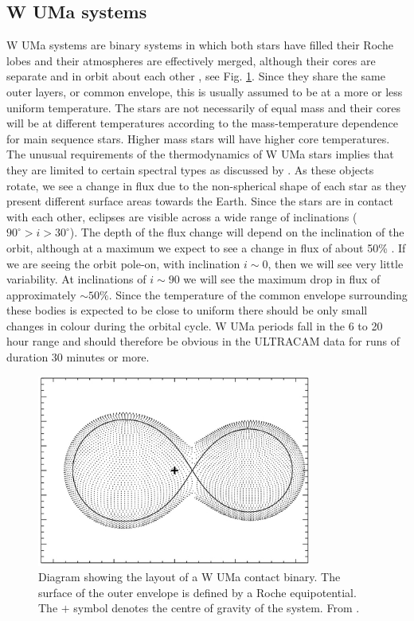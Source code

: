 \subsection{{W UMa} systems}
{W UMa} systems are binary systems in which both stars have filled their Roche lobes and their atmospheres are effectively merged, although their cores are separate and in orbit about each other \citep{Lucy68}, see Fig. \ref{fig:wumadiagram}. Since they share the same outer layers, or common envelope, this is usually assumed to be at a more or less uniform temperature. The stars are not necessarily of equal mass and their cores will be at different temperatures according to the mass-temperature dependence for main sequence stars. Higher mass stars will have higher core temperatures. The unusual requirements of the thermodynamics of W UMa stars implies that they are limited to certain spectral types as discussed by \citet{Lucy68}.  As these objects rotate, we see a change in flux due to the non-spherical shape of each star as they present different surface areas towards the Earth. Since the stars are in contact with each other, eclipses are visible across a wide range of inclinations ($90^\circ > i > 30^\circ$). The depth of the flux change will depend on the inclination of the orbit, although at a maximum we expect to see a change in flux of about 50\% \citep{Lucy68}. If we are seeing the orbit pole-on, with inclination $i \sim 0$, then we will see very little variability. At inclinations of $i \sim 90$ we will see the maximum drop in flux of approximately $\sim50\%$. Since the temperature of the common envelope surrounding these bodies is expected to be close to uniform there should be only small changes in colour during the orbital cycle. W UMa periods fall in the 6 to 20 hour range and should therefore be obvious in the ULTRACAM data for runs of duration 30 minutes or more. 

\begin{figure}
\centering
\includegraphics[width=90mm]{images/wuma_diagram.png}
\caption{Diagram showing the layout of a {W UMa} contact binary. The surface of the outer envelope is defined by a Roche equipotential. The $+$ symbol denotes the centre of gravity of the system.  From \citet{0004-637X-764-1-62}. }
\label{fig:wumadiagram}
\end{figure}

